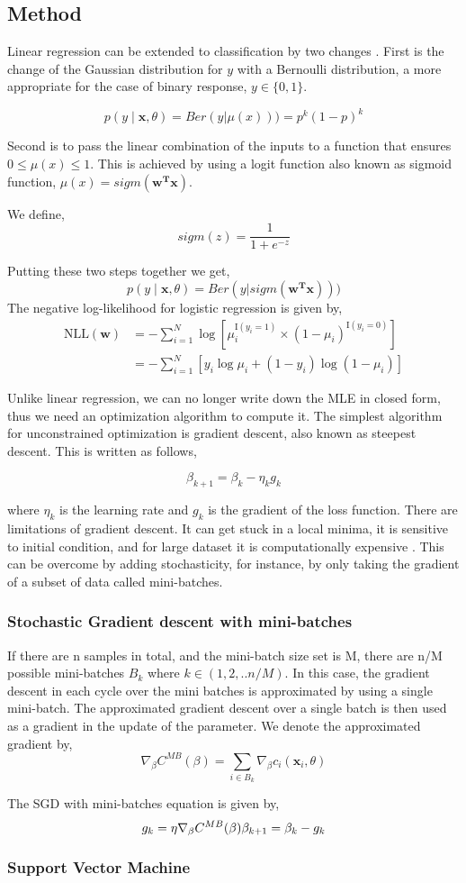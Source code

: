 \subsection{Method} \label{subsec:method_logistic_regression}
Linear regression can be extended to classification by two changes \cite{murphy_machine_2012}. First is the change of the Gaussian distribution for $y$ with a Bernoulli distribution, a more appropriate for the case of binary response, $y \in \{0,1\}$. 

$$
p(y \mid \mathbf{x}, \theta)=Ber(y|\mu(x))) = p^k(1-p)^k$$ 

Second is to pass the linear combination of the inputs to a function that ensures $0 \leq \mu(x)\leq 1$. This is achieved by using a logit function also known as sigmoid function, $\mu(x) = sigm(\mathbf{w^T x})$. 

We define,
$$
sigm(z ) = \frac{1}{1 + e^{-z}}
$$

Putting these two steps together we get,
$$
p(y \mid \mathbf{x}, \theta)=Ber(y|sigm(\mathbf{w^T x})))
$$
The negative log-likelihood for logistic regression is given by, 
$$
\begin{aligned}\mathrm{NLL}(\mathbf{w}) &=-\sum_{i=1}^{N} \log \left[\mu_{i}^{\mathrm{I}\left(y_{i}=1\right)} \times\left(1-\mu_{i}\right)^{\mathrm{I}\left(y_{i}=0\right)}\right] \\&=-\sum_{i=1}^{N}\left[y_{i} \log \mu_{i}+\left(1-y_{i}\right) \log \left(1-\mu_{i}\right)\right]\end{aligned}
$$

Unlike linear regression, we can no longer write down the MLE in closed form, thus we need an optimization algorithm to compute it. The simplest algorithm for unconstrained optimization is gradient descent, also known as steepest descent. This is written as follows,

$$\beta_{k+1} = \beta_k - \eta_k g_k$$

where $\eta_k$ is the learning rate and $g_k$ is the gradient of the loss function. There are limitations of gradient descent. It can get stuck in a local minima, it is sensitive to initial condition, and for large dataset it is computationally expensive \cite{mehta2019high}. This can be overcome by adding stochasticity, for instance, by only taking the gradient of a subset of data called mini-batches. 

\subsubsection{Stochastic Gradient descent with mini-batches}
If there are n samples in total, and the mini-batch size set is M, there are n/M possible mini-batches $B_k $ where $k \in (1,2,..n/M)$. In this case, the gradient descent in each cycle over the mini batches is approximated by using a single mini-batch. The approximated gradient descent over a single batch is then used as a gradient in the update of the parameter. We denote the approximated gradient by, 
$$
\nabla_{\beta} C^{MB}(\beta) = \sum_{i\in B_k} \nabla_\beta c_i(\textbf{x}_i, \theta)
$$

The SGD with mini-batches equation is given by, 
$$
g_k = \eta \nabla_{\beta} C^{MB}(\beta) \\
\beta_{k+1} = \beta_k - g_k
$$

\subsubsection{Support Vector Machine}\label{subsubsec:SVM}
